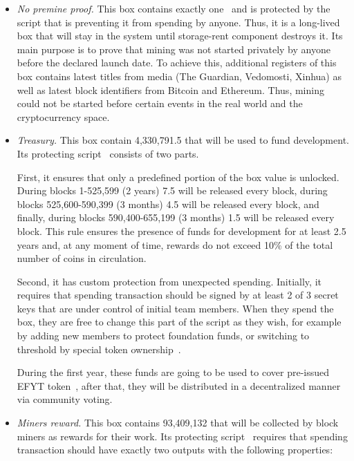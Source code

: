 \begin{itemize}
    \item{\em No premine proof.} This box contains exactly one~\Erg{} and is protected by the script
    that is preventing it from spending by anyone.
    Thus, it is a long-lived box that will stay in the system until storage-rent component
    destroys it.
    Its main purpose is to prove that \Ergo{} mining was not started privately by anyone before
    the declared launch date.
    To achieve this, additional registers of this box contains latest titles from media (The Guardian, Vedomosti, Xinhua)
    as well as latest block identifiers from Bitcoin and Ethereum.
    Thus, \Ergo{} mining could not be started before certain events in the real world and the
    cryptocurrency space.

    \item{\em Treasury.} This box contain 4,330,791.5 \Erg{} that will be used to fund \Ergo{}
    development.
    Its protecting script~\cite{link to corresponding ergo tree} consists of two parts.

    First, it ensures that only a predefined portion of the box value is unlocked.
    During blocks 1-525,599 (2 years) 7.5 \Erg{} will be released every block,
    during blocks 525,600-590,399 (3 months) 4.5 \Erg{} will be released every block, and finally,
    during blocks 590,400-655,199 (3 months) 1.5 \Erg{} will be released every block.
    This rule ensures the presence of funds for \Ergo{} development for at least 2.5 years and, at any moment of time,
    rewards do not exceed 10\% of the total number of coins in circulation.

    Second, it has custom protection from unexpected spending.
    Initially, it requires that spending transaction should be signed by at least 2 of 3 secret keys
    that are under control of initial team members. When they spend the box, they are free to
    change this part of the script as they wish, for example by adding new members to protect foundation
    funds, or switching to threshold by special token ownership~\cite{link to ...}.

    During the first year, these funds are going to be used to cover pre-issued EFYT token~\cite{our website},
    after that, they will be distributed in a decentralized manner via community voting.


    \item{\em Miners reward.} This box contains 93,409,132 \Erg{} that will be collected by block miners
    as rewards for their work.
    Its protecting script~\cite{link to corresponding ergo tree} requires that spending transaction
    should have exactly two outputs with the following properties:


\end{itemize}
